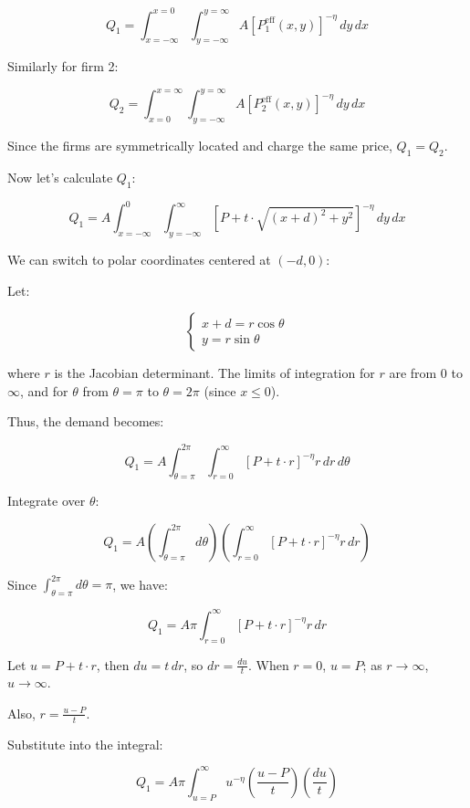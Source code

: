 \[
Q_1 = \int_{x = -\infty}^{x = 0} \int_{y = -\infty}^{y = \infty} A \left[ P_1^{\text{eff}}(x, y) \right]^{-\eta} \, dy \, dx
\]

Similarly for firm 2:

\[
Q_2 = \int_{x = 0}^{x = \infty} \int_{y = -\infty}^{y = \infty} A \left[ P_2^{\text{eff}}(x, y) \right]^{-\eta} \, dy \, dx
\]

Since the firms are symmetrically located and charge the same price, \( Q_1 = Q_2 \).

Now let's calculate \( Q_1 \):

\[
Q_1 = A \int_{x = -\infty}^{0} \int_{y = -\infty}^{\infty} \left[ P + t \cdot \sqrt{(x + d)^2 + y^2} \right]^{-\eta} \, dy \, dx
\]

We can switch to polar coordinates centered at \( (-d, 0) \):

Let:

\[
\begin{cases}
x + d = r \cos \theta \\
y = r \sin \theta
\end{cases}
\]

where $r$ is the Jacobian determinant. 
The limits of integration for \( r \) are from \( 0 \) to \( \infty \), and for \( \theta \) from \( \theta = \pi \) to \( \theta = 2\pi \) (since \( x \leq 0 \)).

Thus, the demand becomes:

\[
Q_1 = A \int_{\theta = \pi}^{2\pi} \int_{r = 0}^{\infty} \left[ P + t \cdot r \right]^{-\eta} r \, dr \, d\theta
\]

Integrate over \( \theta \):

\[
Q_1 = A \left( \int_{\theta = \pi}^{2\pi} d\theta \right) \left( \int_{r = 0}^{\infty} \left[ P + t \cdot r \right]^{-\eta} r \, dr \right)
\]

Since \( \int_{\theta = \pi}^{2\pi} d\theta = \pi \), we have:

\[
Q_1 = A \pi \int_{r = 0}^{\infty} \left[ P + t \cdot r \right]^{-\eta} r \, dr
\]

Let \( u = P + t \cdot r \), then \( du = t \, dr \), so \( dr = \frac{du}{t} \). When \( r = 0 \), \( u = P \); as \( r \to \infty \), \( u \to \infty \).

Also, \( r = \frac{u - P}{t} \).

Substitute into the integral:

\[
Q_1 = A \pi \int_{u = P}^{\infty} u^{-\eta} \left( \frac{u - P}{t} \right) \left( \frac{du}{t} \right)
\]

